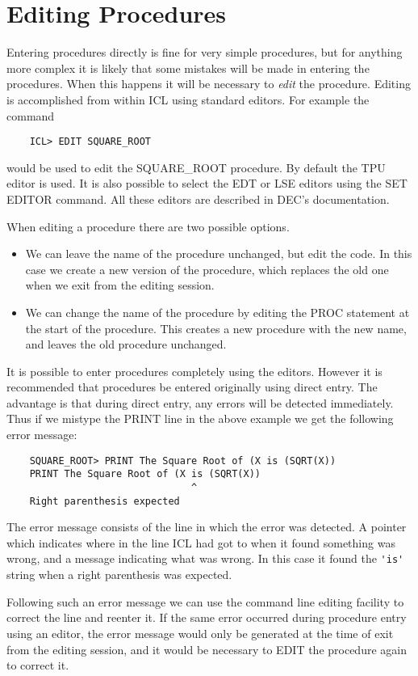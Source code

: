 \documentclass[twoside,11pt]{report}
\newcommand{\xlabel}[1]{}
\begin{document}
\section{\xlabel{editing_procedures}Editing Procedures}
Entering procedures directly is fine for very simple procedures, but for
anything more complex it is likely that some mistakes will be made in
entering the procedures. When this happens it will be necessary to
{\em edit} the procedure. Editing is accomplished from within ICL using
standard editors.
For example the command
\begin{verbatim}
    ICL> EDIT SQUARE_ROOT
\end{verbatim}
would be used to edit the SQUARE\_ROOT procedure. By default the TPU editor
is used. It is also possible to select the EDT or LSE editors using the
SET EDITOR command. All these editors are described in DEC's documentation.

When editing a procedure there are two possible options.
\begin{itemize}
\item We can leave the name of the procedure unchanged, but edit the code. In
this case we create a new version of the procedure, which replaces the old
one when we exit from the editing session.
\item We can change the name of the procedure by editing the PROC statement
at the start of the procedure. This creates a new procedure with the
new name, and leaves the old procedure unchanged.
\end{itemize}

It is possible to enter procedures completely using the editors. However
it is recommended that procedures be entered originally using direct entry.
The advantage is that during direct entry, any errors will be detected immediately.
Thus if we mistype the PRINT line in the above example we get the following
error message:
\begin{verbatim}
    SQUARE_ROOT> PRINT The Square Root of (X is (SQRT(X))
    PRINT The Square Root of (X is (SQRT(X))
                                ^
    Right parenthesis expected
\end{verbatim}
The error message consists of the line in which the error was detected. A
pointer which indicates where in the line ICL had got to when it found
something was wrong, and a message indicating what was wrong. In this case
it found the \verb+'is'+ string when a right parenthesis was expected.

Following such an error message we can use the command line editing facility
to correct the line and reenter it. If the same error occurred during
procedure entry using an editor, the error message would only be generated
at the time of exit from the editing session, and it would be necessary to
EDIT the procedure again to correct it.
\end{document}
